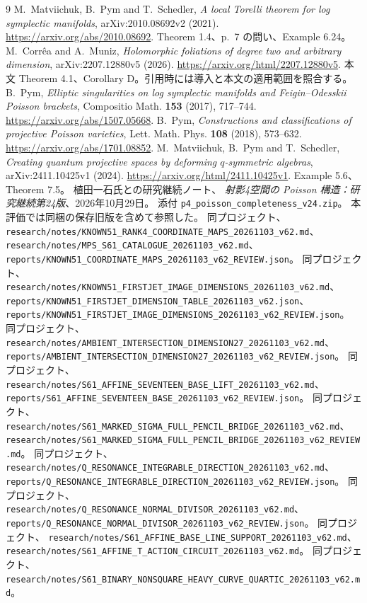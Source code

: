\documentclass[11pt,a4paper]{ltjsarticle}
\theoremstyle{remark}\newtheorem{remark}[proposition]{注意}
\begin{document}
\begin{thebibliography}{9}
M.~Matviichuk, B.~Pym and T.~Schedler,
\emph{A local Torelli theorem for log symplectic manifolds},
arXiv:2010.08692v2 (2021).
\url{https://arxiv.org/abs/2010.08692}.
Theorem 1.4、p.~7 の問い、Example 6.24。
M.~Corrêa and A.~Muniz,
\emph{Holomorphic foliations of degree two and arbitrary dimension},
arXiv:2207.12880v5 (2026).
\url{https://arxiv.org/html/2207.12880v5}.
本文 Theorem 4.1、Corollary D。引用時には導入と本文の適用範囲を照合する。
B.~Pym,
\emph{Elliptic singularities on log symplectic manifolds and Feigin--Odesskii Poisson brackets},
Compositio Math. \textbf{153} (2017), 717--744.
\url{https://arxiv.org/abs/1507.05668}.
B.~Pym,
\emph{Constructions and classifications of projective Poisson varieties},
Lett. Math. Phys. \textbf{108} (2018), 573--632.
\url{https://arxiv.org/abs/1701.08852}.
M.~Matviichuk, B.~Pym and T.~Schedler,
\emph{Creating quantum projective spaces by deforming $q$-symmetric algebras},
arXiv:2411.10425v1 (2024).
\url{https://arxiv.org/html/2411.10425v1}.
Example 5.6、Theorem 7.5。
植田一石氏との研究継続ノート、
\emph{射影4空間の Poisson 構造：研究継続第24版}、2026年10月29日。
添付 \texttt{p4\_poisson\_completeness\_v24.zip}。
本評価では同梱の保存旧版を含めて参照した。
 同プロジェクト、
\nolinkurl{research/notes/KNOWN51_RANK4_COORDINATE_MAPS_20261103_v62.md}、
\nolinkurl{research/notes/MPS_S61_CATALOGUE_20261103_v62.md}、
\nolinkurl{reports/KNOWN51_COORDINATE_MAPS_20261103_v62_REVIEW.json}。
 同プロジェクト、
\nolinkurl{research/notes/KNOWN51_FIRSTJET_IMAGE_DIMENSIONS_20261103_v62.md}、
\nolinkurl{reports/KNOWN51_FIRSTJET_DIMENSION_TABLE_20261103_v62.json}、
\nolinkurl{reports/KNOWN51_FIRSTJET_IMAGE_DIMENSIONS_20261103_v62_REVIEW.json}。
 同プロジェクト、
\nolinkurl{research/notes/AMBIENT_INTERSECTION_DIMENSION27_20261103_v62.md}、
\nolinkurl{reports/AMBIENT_INTERSECTION_DIMENSION27_20261103_v62_REVIEW.json}。
 同プロジェクト、
\nolinkurl{research/notes/S61_AFFINE_SEVENTEEN_BASE_LIFT_20261103_v62.md}、
\nolinkurl{reports/S61_AFFINE_SEVENTEEN_BASE_20261103_v62_REVIEW.json}。
 同プロジェクト、
\nolinkurl{research/notes/S61_MARKED_SIGMA_FULL_PENCIL_BRIDGE_20261103_v62.md}、
\nolinkurl{research/notes/S61_MARKED_SIGMA_FULL_PENCIL_BRIDGE_20261103_v62_REVIEW.md}。
 同プロジェクト、
\nolinkurl{research/notes/Q_RESONANCE_INTEGRABLE_DIRECTION_20261103_v62.md}、
\nolinkurl{reports/Q_RESONANCE_INTEGRABLE_DIRECTION_20261103_v62_REVIEW.json}。
 同プロジェクト、
\nolinkurl{research/notes/Q_RESONANCE_NORMAL_DIVISOR_20261103_v62.md}、
\nolinkurl{reports/Q_RESONANCE_NORMAL_DIVISOR_20261103_v62_REVIEW.json}。
 同プロジェクト、
\nolinkurl{research/notes/S61_AFFINE_BASE_LINE_SUPPORT_20261103_v62.md}、
\nolinkurl{research/notes/S61_AFFINE_T_ACTION_CIRCUIT_20261103_v62.md}。
 同プロジェクト、
\nolinkurl{research/notes/S61_BINARY_NONSQUARE_HEAVY_CURVE_QUARTIC_20261103_v62.md}。
\end{thebibliography}
\end{document}
